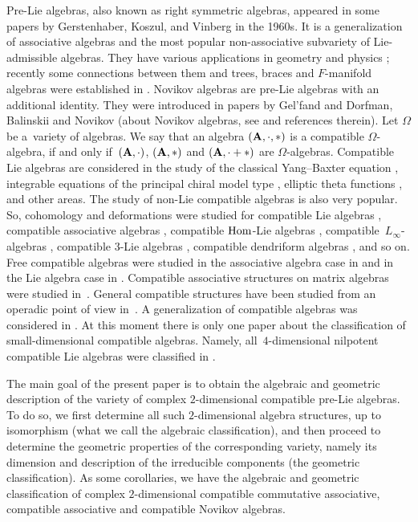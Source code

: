 \documentclass[10pt,a4paper]{amsart}
\numberwithin{equation}{section}
\begin{document}
Pre-Lie algebras, also known as right symmetric algebras,
appeared in some papers by Gerstenhaber, Koszul, and Vinberg in the 1960s.
It is a generalization of associative algebras and the most popular non-associative subvariety of Lie-admissible algebras.
They have various applications in geometry and physics \cite{B06};
recently some connections between them and trees, braces and $F$-manifold algebras were established in \cite{CL,lsb20, SS24,S22}.
Novikov algebras are pre-Lie algebras with an additional identity.
They were introduced in papers by
Gel'fand and Dorfman, Balinskii and Novikov (about Novikov algebras, see \cite{DIU} and references therein). Let $\Omega$ be a~variety of algebras.
 We say that an algebra $(\bf A, \cdot, \ast)$ is a compatible $\Omega$-algebra,
 if and only if~$(\bf A, \cdot)$, $(\bf A, \ast)$
and $(\bf A, \cdot + \ast)$ are $\Omega$-algebras.
Compatible Lie algebras are considered in the study of the classical Yang--Baxter equation \cite{GS06},
integrable equations of the principal chiral model type \cite{GS02},
elliptic theta functions \cite{OS04}, and other areas.
The study of non-Lie compatible algebras is also very popular.
So, cohomology and deformations were studied for
compatible Lie algebras \cite{lsb23},
compatible associative algebras \cite{CDM},
compatible ${\rm Hom}$-Lie algebras \cite{D23},
compatible~$L_{\infty}$-algebras \cite{D22},
compatible $3$-Lie algebras \cite{HSZ},
compatible dendriform algebras \cite{DSQ}, and so on.
Free compatible algebras were studied in the associative algebra case in \cite{D09} and
in the Lie algebra case in \cite{GR,l10}.
Compatible associative structures on matrix algebras were studied in~\cite{OS05,OS06,OS08}.
General compatible structures have been studied from an operadic point of view in~\cite{S08,zgg}.
A generalization of compatible algebras was considered in \cite{Khr}.
At this moment there is only one paper about the classification of small-dimensional compatible algebras.
Namely, all~$4$-dimensional nilpotent compatible Lie algebras were classified in \cite{LLL}.

The main goal of the present paper is to obtain the algebraic and geometric description of the variety of complex $2$-dimensional compatible pre-Lie algebras. To do so, we first determine all such $2$-dimensional algebra structures, up to isomorphism (what we call the algebraic classification), and then proceed to determine the geometric properties of the corresponding variety, namely its dimension and description of the irreducible components (the geometric classification).
As some corollaries, we have the algebraic and geometric classification of complex $2$-dimensional
compatible commutative associative,
compatible associative
and compatible Novikov algebras.
\end{document}
